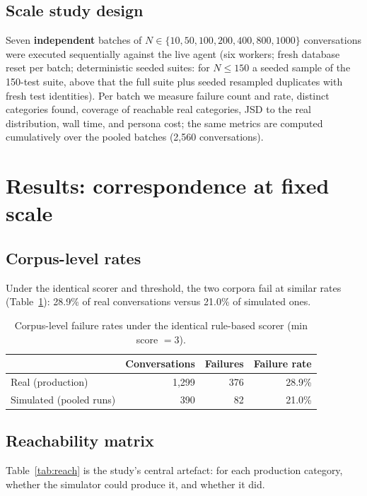\documentclass[11pt,a4paper]{article}
\begin{document}
\subsection{Scale study design}
\label{sec:scaledesign}
Seven \textbf{independent} batches of $N\in\{10,50,100,200,400,800,1000\}$ conversations were
executed sequentially against the live agent (six workers; fresh database reset per batch;
deterministic seeded suites: for $N\leq150$ a seeded sample of the 150-test suite, above that the
full suite plus seeded resampled duplicates with fresh test identities). Per batch we measure
failure count and rate, distinct categories found, coverage of reachable real categories, JSD to
the real distribution, wall time, and persona cost; the same metrics are computed cumulatively
over the pooled batches (2{,}560 conversations).

\section{Results: correspondence at fixed scale}
\label{sec:results}

\subsection{Corpus-level rates}
Under the identical scorer and threshold, the two corpora fail at similar rates
(Table~\ref{tab:corpus}): 28.9\% of real conversations versus 21.0\% of simulated ones.

\begin{table}[H]
\centering
\caption{Corpus-level failure rates under the identical rule-based scorer (min score $=3$).}
\label{tab:corpus}
\begin{tabular}{lrrr}
\toprule
 & Conversations & Failures & Failure rate \\
\midrule
Real (production)        & 1{,}299 & 376 & 28.9\% \\
Simulated (pooled runs)  &   390   &  82 & 21.0\% \\
\bottomrule
\end{tabular}
\end{table}

\subsection{Reachability matrix}
Table~\ref{tab:reach} is the study's central artefact: for each production category, whether the
simulator could produce it, and whether it did.
\end{document}
